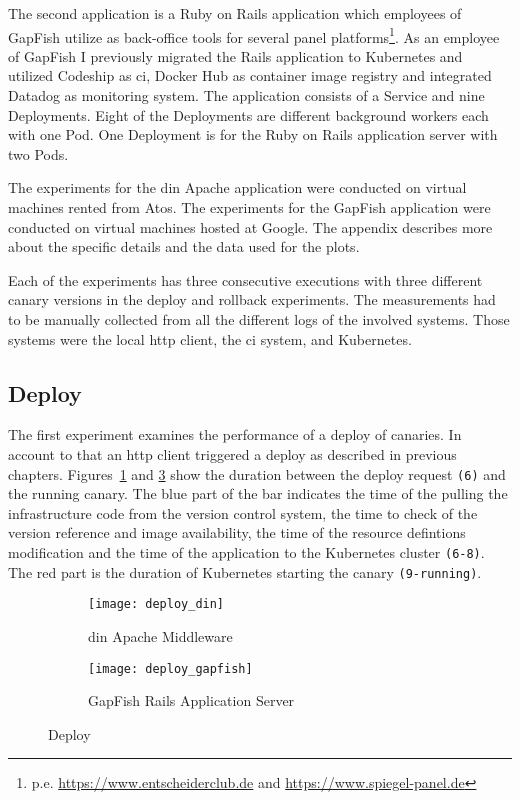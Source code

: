 The second application is a Ruby on Rails application which employees of GapFish utilize
as back-office tools for several panel
platforms\footnote{p.e. \url{https://www.entscheiderclub.de} and
  \url{https://www.spiegel-panel.de}}. As an employee of GapFish I previously migrated the
Rails application to Kubernetes and utilized Codeship as \gls{ci}, Docker Hub as container
image registry and integrated Datadog as monitoring system. The application consists of a
Service and nine Deployments. Eight of the Deployments are different background workers
each with one Pod. One Deployment is for the Ruby on Rails application server with two
Pods.

The experiments for the \gls{din} Apache application were conducted on virtual machines
rented from Atos. The experiments for the GapFish application were conducted on virtual
machines hosted at Google. The appendix describes more about the specific details and the
data used for the plots.

Each of the experiments has three consecutive executions with three different canary
versions in the deploy and rollback experiments. The measurements had to be manually
collected from all the different logs of the involved systems. Those systems were the local \gls{http}
client, the \gls{ci} system, \deployer{} and Kubernetes.

\subsection{Deploy}

The first experiment examines the performance of a deploy of canaries. In account to
that an \gls{http} client triggered a deploy as described in previous
chapters. Figures~\ref{fig:deploy_din} and \ref{fig:deploy_gapfish} show the duration
between the deploy request \texttt{(6)} and the running canary. The blue part of the bar indicates
the time of the \deployer{} pulling the infrastructure code from the version control system,
the time to check of the version reference and image availability, the time of the resource defintions modification
and the time of the application to the Kubernetes cluster \texttt{(6-8)}. The red part is the duration
of Kubernetes starting the canary \texttt{(9-running)}.

\begin{figure}[htbp]
  \label{fig:deploy}
  \centering
  \begin{subfigure}{.5\textwidth}
    \texttt{[image: deploy\_din]}
    \caption{\gls{din} Apache Middleware}
    \label{fig:deploy_din}
  \end{subfigure}%
  \begin{subfigure}{.5\textwidth}
    \texttt{[image: deploy\_gapfish]}
    \caption[GapFish]{GapFish Rails Application Server}
    \label{fig:deploy_gapfish}
  \end{subfigure}
  \caption{Deploy}
\end{figure}

